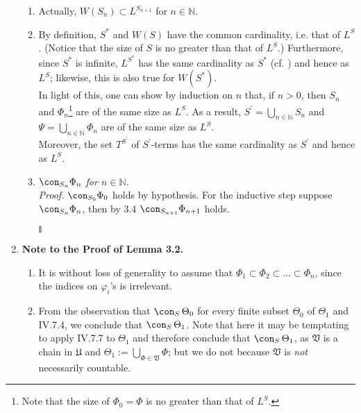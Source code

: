 \begin{enumerate}[1.]
\begin{enumerate}[(1)]
\item Actually, $W(S_n) \subset L^{S_{n+1}}$ for $n \in \mathbb{N}$.
\item By definition, $S^\ast$ and $W(S)$ have the common cardinality, i.e. that of $L^S$.  (Notice that the size of $S$ is no greater than that of $L^S$.) Furthermore, since $S^\ast$ is infinite, $L^{S^\ast}$ has the same cardinality as $S^\ast$ (cf. \cite{Thomas_Jech, Kenneth_Kunen}) and hence as $L^S$; likewise, this is also true for $W(S^\ast)$.\newline
\ 
\\In light of this, one can show by induction on $n$ that, if $n > 0$, then $S_n$ and $\Phi_n$\footnote{Note that the size of $\Phi_0 = \Phi$ is no greater than that of $L^S$.} are of the same size as $L^S$. As a result, $S^\prime = \bigcup_{n \in \mathbb{N}} S_n$ and $\Psi = \bigcup_{n \in \mathbb{N}} \Phi_n$ are of the same size as $L^S$.\newline
\ 
\\Moreover, the set $T^{S^\prime}$ of $S^\prime$-terms has the same cardinality as $S^\prime$ and hence as $L^S$.
\item \textit{$\con_{S_n} \Phi_n$ for $n \in \mathbb{N}$.}\\
\textit{Proof.} $\con_{S_0} \Phi_0$ holds by hypothesis. For the inductive step suppose $\con_{S_n} \Phi_n$, then by 3.4 $\con_{S_{n+1}} \Phi_{n+1}$ holds. \begin{flushright}$\talloblong$\end{flushright}
\end{enumerate}
%
\item \textbf{Note to the Proof of Lemma 3.2.}
\begin{enumerate}[(1)]
\item It is without loss of generality to assume that $\Phi_1 \subset \Phi_2 \subset \ldots \subset \Phi_n$, since the indices on $\varphi_i$'s is irrelevant.
\item From the observation that $\con_S \, \Theta_0$ for every finite subset $\Theta_0$ of $\Theta_1$ and IV.7.4, we conclude that $\con_S \, \Theta_1$. Note that here it may be temptating to apply IV.7.7 to $\Theta_1$ and therefore conclude that $\con_S \, \Theta_1$, as $\mathfrak{V}$ is a chain in $\mathfrak{U}$ and $\Theta_1 := \bigcup_{\Phi \in \mathfrak{V}} \Phi$; but we do not because $\mathfrak{V}$ is \emph{not} necessarily countable.
\end{enumerate}
\end{enumerate}

